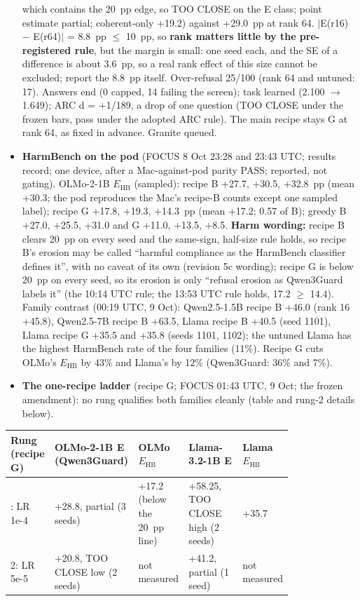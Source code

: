 \documentclass{article}
\theoremstyle{plain}
\theoremstyle{definition}
\theoremstyle{remark}
\begin{document}
\begin{itemize}
        which contains the 20~pp edge, so TOO CLOSE on the E class; point
        estimate partial; coherent-only +19.2) against +29.0~pp at rank 64.
        $|$E(r16) $-$ E(r64)$|$ = 8.8~pp $\le$ 10~pp, so \textbf{rank matters
        little by the pre-registered rule}, but the margin is small: one seed
        each, and the SE of a difference is about 3.6~pp, so a real rank effect
        of this size cannot be excluded; report the 8.8~pp itself. Over-refusal
        25/100 (rank 64 and untuned: 17). Answers end (0 capped, 14 failing the
        screen); task learned (2.100 $\to$ 1.649); ARC d = +1/189, a drop of one
        question (TOO CLOSE under the frozen bars, pass under the adopted ARC
        rule). The main recipe stays G at rank 64, as fixed in advance. Granite
        queued.
  \item \textbf{HarmBench on the pod} (FOCUS 8 Oct 23:28 and 23:43 UTC; results
        record; one device, after a Mac-against-pod parity PASS; reported, not
        gating). OLMo-2-1B $E_{\mathrm{HB}}$ (sampled): recipe B +27.7, +30.5,
        +32.8~pp (mean +30.3; the pod reproduces the Mac's recipe-B counts
        except one sampled label); recipe G +17.8, +19.3, +14.3~pp (mean +17.2;
        0.57 of B); greedy B +27.0, +25.5, +31.0 and G +11.0, +13.5, +8.5.
        \textbf{Harm wording:} recipe B clears 20~pp on every seed and the
        same-sign, half-size rule holds, so recipe B's erosion may be called
        ``harmful compliance as the HarmBench classifier defines it'', with no
        caveat of its own (revision 5c wording); recipe G is below 20~pp on
        every seed, so its erosion is only ``refusal erosion as Qwen3Guard
        labels it'' (the 10:14 UTC rule; the 13:53 UTC rule holds, 17.2 $\ge$
        14.4). Family contrast (00:19 UTC, 9 Oct): Qwen2.5-1.5B recipe B +46.0
        (rank 16 +45.8), Qwen2.5-7B recipe B +63.5, Llama recipe B +40.5 (seed
        1101), Llama recipe G +35.5 and +35.8 (seeds 1101, 1102); the untuned
        Llama has the highest HarmBench rate of the four families (11\%). Recipe
        G cuts OLMo's $E_{\mathrm{HB}}$ by 43\% and Llama's by 12\% (Qwen3Guard:
        36\% and 7\%).
  \item \textbf{The one-recipe ladder} (recipe G; FOCUS 01:43 UTC, 9 Oct; the
        frozen amendment): no rung qualifies both families cleanly (table and
        rung-2 details below).
\end{itemize}

\begin{longtable}{@{}L{0.13\linewidth}L{0.21\linewidth}L{0.15\linewidth}L{0.19\linewidth}L{0.12\linewidth}@{}}
  \toprule
  \textbf{Rung (recipe G)} & \textbf{OLMo-2-1B E (Qwen3Guard)} & \textbf{OLMo
      $E_{\mathrm{HB}}$} & \textbf{Llama-3.2-1B E} & \textbf{Llama
      $E_{\mathrm{HB}}$} \\
  \midrule
  \endhead
  \bottomrule
  : LR 1e-4 & +28.8, partial (3 seeds) & +17.2 (below the 20~pp line) & +58.25,
      TOO CLOSE high (2 seeds) & +35.7 \\
  2: LR 5e-5 & +20.8, TOO CLOSE low (2 seeds) & not measured & +41.2, partial (1
      seed) & not measured \\
\end{longtable}
\end{document}
